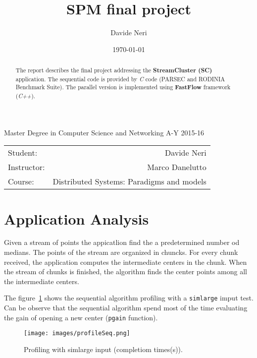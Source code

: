\documentclass[12pt]{article}
\title{SPM final project}
\author{Davide Neri}
\date{\today}
\begin{document}
\maketitle    %
\begin{center}
Master Degree in Computer Science and Networking 
A-Y 2015-16

\end{center}

\begin{center}

\begin{tabular}{l r}
Student: & Davide Neri \\ %
Instructor: & Marco Danelutto \\%
Course: & Distributed Systems: Paradigms and models\\
\end{tabular}
\end{center}

\begin{abstract} 
The report describes the final project addressing the \textbf{StreamCluster (SC)} application. The sequential code is provided by \emph{C} code (PARSEC and RODINIA Benchmark Suite). The parallel version is implemented using \textbf{FastFlow} framework (\emph{C++}).
\end{abstract}

\section{Application Analysis}
Given a stream  of points the appicatlion find the a predetermined number od medians.
The points of the stream are organized in chuncks. For every chunk received, the application  computes the intermediate centers in the chunk. When the stream of chunks is finished, the algorithm finds the center points among all the intermediate centers.

The figure~\ref{fig:profile} shows the sequential algorithm profiling with a \texttt{simlarge} imput test. Can be observe that the sequential algorithm spend most of the time evaluating the gain of opening a new center (\texttt{pgain} function). 

\begin{figure}
\center
\texttt{[image: images/profileSeq.png]}
\caption{Profiling with simlarge input (completiom times(s)).}
\label{fig:profile}
\end{figure}
\end{document}
